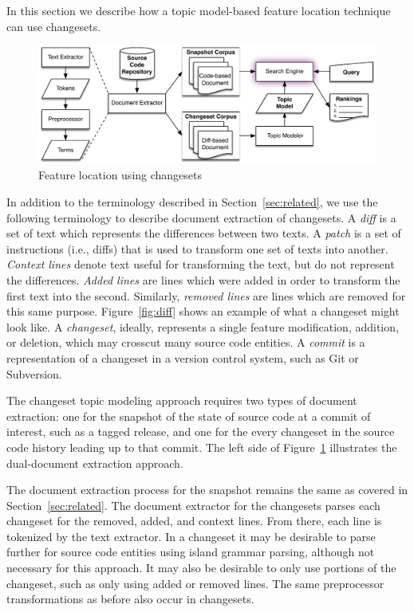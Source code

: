 In this section we describe how a topic model-based feature location
technique can use changesets.



\begin{figure}
\vspace{2mm}
\centerline{\includegraphics[width=.75\textwidth]{figures/changeset-flt}}
\caption{Feature location using changesets}
\label{fig:changeset}
\vspace{-2mm}
\end{figure}

In addition to the terminology described in Section~\ref{sec:related},
we use the following terminology to describe document extraction of changesets.
A \textit{diff} is a set of text which represents the differences between two texts.
A \textit{patch} is a set of instructions (i.e., diffs) that is used to transform one set of texts into another.
\textit{Context lines} denote text useful for transforming the text, but do not represent the differences.
\textit{Added lines} are lines which were added in order to transform the first text into the second.
Similarly, \textit{removed lines} are lines which are removed for this same purpose.
Figure~\ref{fig:diff} shows an example of what a changeset might look like.
A \textit{changeset}, ideally, represents a single feature modification,
addition, or deletion, which may crosscut many source code entities.
A \textit{commit} is a representation of a changeset in a version control system, such as Git or Subversion.

The changeset topic modeling approach requires two types of document extraction:
one for the snapshot of the state of source code at a commit of interest, such as a tagged release,
and one for the every changeset in the source code history leading up to that commit.
The left side of Figure~\ref{fig:changeset} illustrates the dual-document extraction approach.

The document extraction process for the snapshot remains the same as covered in Section~\ref{sec:related}.
The document extractor for the changesets parses each changeset for the removed, added, and context lines.
From there, each line is tokenized by the text extractor.
In a changeset it may be desirable to parse further for source code entities using island grammar parsing\needcite,
although not necessary for this approach.
It may also be desirable to only use portions of the changeset, such as only using added or removed lines.
The same preprocessor transformations as before also occur in changesets.

